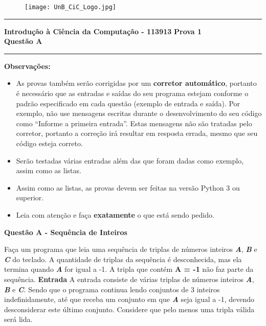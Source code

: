 \documentclass[a4paper, 12pt]{article}
\begin{document}
\begin{figure}[H]
	\texttt{[image: UnB\_CiC\_Logo.jpg]}
\end{figure}
\noindent\rule{\textwidth}{0.4pt}
\begin{center}
	\textbf{{\Large Introdução à Ciência da Computação - 113913}} \newline \newline
	\textbf{{\large Prova 1} \\
	\vspace{9pt}
	{\large Questão A}} \\
	\noindent\rule{\textwidth}{0.4pt}
	\newline
\end{center}

\textbf{{\large Observações:}}
\begin{itemize}
	\item As provas também serão corrigidas por um \textbf{corretor automático}, portanto é necessário que as entradas e saídas do seu programa estejam conforme o padrão especificado em cada questão (exemplo de entrada e saída). Por exemplo, não use mensagens escritas durante o desenvolvimento do seu código como “Informe a primeira entrada”. Estas mensagens não são tratadas pelo corretor, portanto a correção irá resultar em resposta errada, mesmo que seu código esteja correto.
	\item Serão testadas várias entradas além das que foram dadas como exemplo, assim como as listas.
	\item Assim como as listas, as provas devem ser feitas na versão Python 3 ou superior.
	\item Leia com atenção e faça \textbf{exatamente} o que está sendo pedido.
\end{itemize}
\newpage %
\begin{center}
\textbf{{\Large Questão A - Sequência de Inteiros}}
\end{center}
\vspace{5pt}
Faça um programa que leia uma sequência de triplas de números inteiros \textbf{\textit{A}}, \textbf{\textit{B}} e \textbf{\textit{C}} do teclado. A quantidade de triplas da sequência é desconhecida, mas ela termina quando \textbf{\textit{A}} for igual a -1. A tripla que contém \textbf{A = -1} não faz parte da sequência.
\newline \newline
\textbf{{\large Entrada}} \newline
A entrada consiste de várias triplas de números inteiros  \textbf{\textit{A}}, \textbf{\textit{B}} e \textbf{\textit{C}}. Sendo que o programa continua lendo conjuntos de 3 inteiros indefinidamente, até que receba um conjunto em que \textbf{\textit{A}} seja igual a -1, devendo desconsiderar este último conjunto. Considere que pelo menos uma tripla válida será lida.
\end{document}
